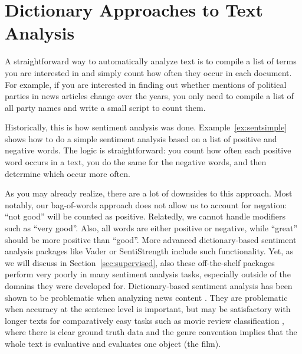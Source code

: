 %
\section{Dictionary Approaches to Text Analysis}
\label{sec:dictionary}

A straightforward way to automatically analyze text is to compile a
list of terms you are interested in and simply count how often they
occur in each document. For example, if you are interested in finding out
whether mentions of political parties in news articles change over
the years, you only need to compile a list of all party names and
write a small script to count them.

Historically, this is how sentiment analysis was
done. Example~\ref{ex:sentsimple} shows how to do a simple sentiment analysis
based on a list of positive and negative words. The logic is
straightforward: you count how often each positive word occurs in a
text, you do the same for the negative words, and then determine which
occur more often.



As you may already realize, there are a lot of downsides to this
approach. Most notably, our bag-of-words approach does not allow us to
account for negation: ``not good'' will be counted as
positive. Relatedly, we cannot handle modifiers such as ``very
good''. Also, all words are either positive or negative, while
``great'' should be more positive than ``good''. More advanced
dictionary-based sentiment analysis packages like Vader \citep{Hutto2014}
or SentiStrength \citep{Thelwall2012} include such functionality. Yet, as we will
discuss in Section~\ref{sec:supervised}, also these off-the-shelf
packages perform very poorly in many sentiment analysis tasks,
especially outside of the domains they were developed for.
Dictionary-based sentiment analysis has been shown to be problematic
when analyzing news content \citep[e.g.][]{Gonzalez-Bailon2015,
  Boukes2019}. They are problematic when accuracy at the sentence
level is important, but may be satisfactory with longer texts for
comparatively easy tasks such as movie review classification
\citep{Reagan2017}, where there is clear ground truth data and the
genre convention implies that the whole text is evaluative and
evaluates one object (the film).


